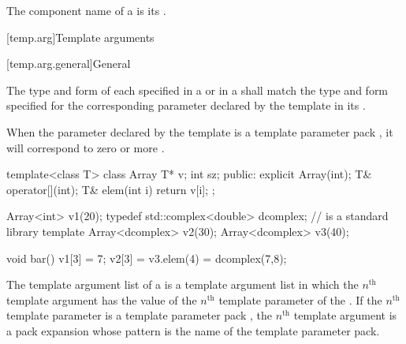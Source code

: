 \documentclass{wg21}
\begin{document}
\begin{addedblock}
\pnum
The component name of a 
is its .
\end{addedblock}

\ednote{[...]}

[temp.arg]{Template arguments}

[temp.arg.general]{General}

\pnum
{}%

The type and form of each  specified
in a  or
in a 
shall match the type and form specified for the corresponding
parameter declared by the template in its
.


When the parameter declared by the template is a template
parameter pack , it will correspond to zero or more
.
\begin{example}
    \begin{codeblock}
        template<class T> class Array {
            T* v;
            int sz;
            public:
            explicit Array(int);
            T& operator[](int);
            T& elem(int i) { return v[i]; }
        };

        Array<int> v1(20);
        typedef std::complex<double> dcomplex;  //  is a standard library template
        Array<dcomplex> v2(30);
        Array<dcomplex> v3(40);

        void bar() {
            v1[3] = 7;
            v2[3] = v3.elem(4) = dcomplex(7,8);
        }
    \end{codeblock}
\end{example}

\pnum
The template argument list of a  is
a template argument list in which the $n^\text{th}$ template argument
has the value of
the $n^\text{th}$ template parameter of the .
If the $n^\text{th}$ template parameter is
a template parameter pack ,
the $n^\text{th}$ template argument is a pack expansion
whose pattern is the name of the template parameter pack.
\end{document}
